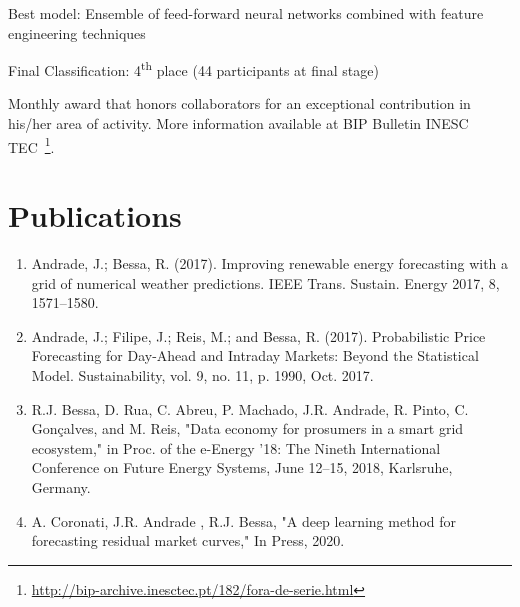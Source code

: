 \documentclass{mycv}
\begin{document}
\begin{myitemize}
	\item Best model: Ensemble of feed-forward neural networks combined with feature engineering techniques
	\item Final Classification: 4\textsuperscript{th} place (44 participants at final stage)
\end{myitemize}


Monthly award that honors collaborators for an exceptional contribution in his/her area of activity. More information available at BIP Bulletin INESC TEC~\footnote{\url{http://bip-archive.inesctec.pt/182/fora-de-serie.html}}.



\pagebreak


\vspace{0.3cm}

\section{Publications}



\begin{enumerate}
		
	\item Andrade, J.; Bessa, R. (2017). Improving renewable energy forecasting with a grid of
	numerical weather predictions. IEEE Trans. Sustain. Energy 2017, 8, 1571–1580.
	
	\item Andrade, J.; Filipe, J.; Reis, M.; and Bessa, R. (2017). Probabilistic Price Forecasting for Day-Ahead and Intraday Markets: Beyond the Statistical Model. Sustainability, vol. 9, no. 11, p. 1990, Oct. 2017.
	
	\item R.J. Bessa, D. Rua, C. Abreu, P. Machado, J.R. Andrade, R. Pinto, C. Gonçalves, and M. Reis, "Data economy for prosumers in a smart grid ecosystem," in Proc. of the e-Energy ’18: The Nineth International Conference on Future Energy Systems, June 12–15, 2018, Karlsruhe, Germany.
	
	\item A. Coronati, J.R. Andrade , R.J. Bessa, "A deep learning method for forecasting residual market curves," In Press, 2020.
	
\end{enumerate}
\end{document}
